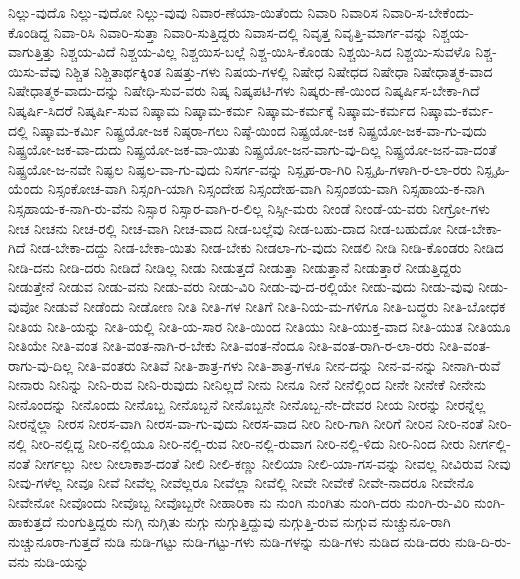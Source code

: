 {ನಿಲ್ಲು-ವುದೊ
ನಿಲ್ಲು-ವುದೋ
ನಿಲ್ಲು-ವುವು
ನಿವಾರ-ಣೆಯಾ-ಯಿತೆಂದು
ನಿವಾರಿ
ನಿವಾರಿಸ
ನಿವಾರಿ-ಸ-ಬೇಕೆಂದು-ಕೊಂಡಿದ್ದ
ನಿವಾ-ರಿಸಿ
ನಿವಾರಿ-ಸುತ್ತಾ
ನಿವಾರಿ-ಸುತ್ತಿದ್ದರು
ನಿವಾಸ-ದಲ್ಲಿ
ನಿವೃತ್ತ
ನಿವೃತ್ತಿ-ಮಾರ್ಗ-ವನ್ನು
ನಿಶ್ಚಯ-ವಾಗುತ್ತಿತ್ತು
ನಿಶ್ಚಯ-ವಿದೆ
ನಿಶ್ಚಯ-ವಿಲ್ಲ
ನಿಶ್ಚಯಿಸ-ಬಲ್ಲೆ
ನಿಶ್ಚ-ಯಿಸಿ-ಕೊಂಡು
ನಿಶ್ಚಯಿ-ಸಿದ
ನಿಶ್ಚಯಿ-ಸುವಳೊ
ನಿಶ್ಚ-ಯಿಸು-ವೆವು
ನಿಶ್ಚಿತ
ನಿಶ್ಚಿತಾರ್ಥಕ್ಕಿಂತ
ನಿಷತ್ತು-ಗಳು
ನಿಷಯ-ಗಳಲ್ಲಿ
ನಿಷೇಧ
ನಿಷೇಧದ
ನಿಷೇಧಾ
ನಿಷೇಧಾತ್ಮಕ-ವಾದ
ನಿಷೇಧಾತ್ಮಕ-ವಾದು-ದನ್ನು
ನಿಷೇಧಿ-ಸುವ-ವರು
ನಿಷ್ಕ
ನಿಷ್ಕಪಟಿ-ಗಳು
ನಿಷ್ಕರು-ಣೆ-ಯಿಂದ
ನಿಷ್ಕರ್ಷಿಸ-ಬೇಕಾ-ಗಿದೆ
ನಿಷ್ಕರ್ಷಿ-ಸಿದರೆ
ನಿಷ್ಕರ್ಷಿ-ಸುವ
ನಿಷ್ಕಾಮ
ನಿಷ್ಕಾಮ-ಕರ್ಮ
ನಿಷ್ಕಾಮ-ಕರ್ಮಕ್ಕೆ
ನಿಷ್ಕಾಮ-ಕರ್ಮದ
ನಿಷ್ಕಾಮ-ಕರ್ಮ-ದಲ್ಲಿ
ನಿಷ್ಕಾಮ-ಕರ್ಮಿ
ನಿಷ್ಟ್ರಯೋ-ಜಕ
ನಿಷ್ಠರಾ-ಗಲು
ನಿಷ್ಠೆ-ಯಿಂದ
ನಿಷ್ಪ್ರಯೋ-ಜಕ
ನಿಷ್ಪ್ರಯೋ-ಜಕ-ವಾ-ಗು-ವುದು
ನಿಷ್ಪ್ರಯೋ-ಜಕ-ವಾ-ದುದು
ನಿಷ್ಪ್ರಯೋ-ಜಕ-ವಾ-ಯಿತು
ನಿಷ್ಪ್ರಯೋ-ಜನ-ವಾಗು-ವು-ದಿಲ್ಲ
ನಿಷ್ಪ್ರಯೋ-ಜನ-ವಾ-ದಂತೆ
ನಿಷ್ಪ್ರಯೋ-ಜ-ನವೇ
ನಿಷ್ಫಲ
ನಿಷ್ಫಲ-ವಾ-ಗು-ವುದು
ನಿಸರ್ಗ-ವನ್ನು
ನಿಸ್ಪೃಹ-ರಾ-ಗಿರಿ
ನಿಸ್ಪೃಹಿ-ಗಳಾಗಿ-ರ-ಲಾ-ರರು
ನಿಸ್ಪೃಹಿ-ಯೆಂದು
ನಿಸ್ಸಂಕೋಚ-ವಾಗಿ
ನಿಸ್ಸಂಗಿ-ಯಾಗಿ
ನಿಸ್ಸಂದೇಹ
ನಿಸ್ಸಂದೇಹ-ವಾಗಿ
ನಿಸ್ಸಂಶಯ-ವಾಗಿ
ನಿಸ್ಸಹಾಯ-ಕ-ನಾಗಿ
ನಿಸ್ಸಹಾಯ-ಕ-ನಾಗಿ-ರು-ವೆನು
ನಿಸ್ಸಾರ
ನಿಸ್ಸಾರ-ವಾಗಿ-ರ-ಲಿಲ್ಲ
ನಿಸ್ಸೀ-ಮರು
ನೀಂಡೆ
ನೀಂಡೆ-ಯ-ವರು
ನೀಗ್ರೋ-ಗಳು
ನೀಚ
ನೀಚನು
ನೀಚ-ರಲ್ಲಿ
ನೀಚ-ವಾಗಿ
ನೀಚ-ವಾದ
ನೀಡ-ಬಲ್ಲೆವು
ನೀಡ-ಬಹು-ದಾದ
ನೀಡ-ಬಹುದೋ
ನೀಡ-ಬೇಕಾ-ಗಿದೆ
ನೀಡ-ಬೇಕಾ-ದದ್ದು
ನೀಡ-ಬೇಕಾ-ಯಿತು
ನೀಡ-ಬೇಕು
ನೀಡಲಾ-ಗು-ವುದು
ನೀಡಲಿ
ನೀಡಿ
ನೀಡಿ-ಕೊಂಡರು
ನೀಡಿದ
ನೀಡಿ-ದನು
ನೀಡಿ-ದರು
ನೀಡಿದೆ
ನೀಡಿಲ್ಲ
ನೀಡು
ನೀಡುತ್ತದೆ
ನೀಡುತ್ತಾ
ನೀಡುತ್ತಾನೆ
ನೀಡುತ್ತಾರೆ
ನೀಡುತ್ತಿದ್ದರು
ನೀಡುತ್ತೇನೆ
ನೀಡುವ
ನೀಡು-ವನು
ನೀಡು-ವರು
ನೀಡು-ವಿರಿ
ನೀಡು-ವು-ದ-ರಲ್ಲಿಯೇ
ನೀಡು-ವುದು
ನೀಡು-ವುವು
ನೀಡು-ವುವೋ
ನೀಡುವೆ
ನೀಡೆಂದು
ನೀಡೋಣ
ನೀತಿ
ನೀತಿ-ಗಳ
ನೀತಿಗೆ
ನೀತಿ-ನಿಯ-ಮ-ಗಳಿಗೂ
ನೀತಿ-ಬದ್ಧರು
ನೀತಿ-ಬೋಧಕ
ನೀತಿಯ
ನೀತಿ-ಯನ್ನು
ನೀತಿ-ಯಲ್ಲಿ
ನೀತಿ-ಯ-ಸಾರ
ನೀತಿ-ಯಿಂದ
ನೀತಿಯು
ನೀತಿ-ಯುಕ್ತ-ವಾದ
ನೀತಿ-ಯುತ
ನೀತಿಯೂ
ನೀತಿಯೇ
ನೀತಿ-ವಂತ
ನೀತಿ-ವಂತ-ನಾಗಿ-ರ-ಬೇಕು
ನೀತಿ-ವಂತ-ನೆಂದೂ
ನೀತಿ-ವಂತ-ರಾಗಿ-ರ-ಲಾ-ರರು
ನೀತಿ-ವಂತ-ರಾಗು-ವು-ದಿಲ್ಲ
ನೀತಿ-ವಂತರು
ನೀತಿವೆ
ನೀತಿ-ಶಾತ್ರ-ಗಳು
ನೀತಿ-ಶಾತ್ರ-ಗಳೂ
ನೀನ-ದನ್ನು
ನೀನ-ವ-ನನ್ನು
ನೀನಾಗಿ-ರುವೆ
ನೀನಾರು
ನೀನಿನ್ನು
ನೀನಿ-ರುವ
ನೀನಿ-ರುವುದು
ನೀನಿಲ್ಲದೆ
ನೀನು
ನೀನೂ
ನೀನೆ
ನೀನೆಲ್ಲಿಂದ
ನೀನೇ
ನೀನೇಕೆ
ನೀನೇನು
ನೀನೊಂದನ್ನು
ನೀನೊಂದು
ನೀನೊಬ್ಬ
ನೀನೊಬ್ಬನೆ
ನೀನೊಬ್ಬನೇ
ನೀನೊಬ್ಬ-ನೇ-ದೇವರ
ನೀಯ
ನೀರನ್ನು
ನೀರನ್ನೆಲ್ಲ
ನೀರನ್ನೆಲ್ಲಾ
ನೀರಸ
ನೀರಸ-ವಾಗಿ
ನೀರಸ-ವಾ-ಗು-ವುದು
ನೀರಸ-ವಾದ
ನೀರಿ
ನೀರಿ-ಗಾಗಿ
ನೀರಿಗೆ
ನೀರಿನ
ನೀರಿ-ನಂತೆ
ನೀರಿ-ನಲ್ಲಿ
ನೀರಿ-ನಲ್ಲಿದ್ದ
ನೀರಿ-ನಲ್ಲಿಯೂ
ನೀರಿ-ನಲ್ಲಿ-ರುವ
ನೀರಿ-ನಲ್ಲಿ-ರುವಾಗ
ನೀರಿ-ನಲ್ಲಿ-ಳಿದು
ನೀರಿ-ನಿಂದ
ನೀರು
ನೀರ್ಗಲ್ಲಿ-ನಂತೆ
ನೀರ್ಗಲ್ಲು
ನೀಲ
ನೀಲಾಕಾಶ-ದಂತೆ
ನೀಲಿ
ನೀಲಿ-ಕಣ್ಣು
ನೀಲಿಯಾ
ನೀಲಿ-ಯಾ-ಗಸ-ವನ್ನು
ನೀವಲ್ಲ
ನೀವಿರುವ
ನೀವು
ನೀವು-ಗಳೆಲ್ಲ
ನೀವೂ
ನೀವೆ
ನೀವೆಲ್ಲ
ನೀವೆಲ್ಲರೂ
ನೀವೆಲ್ಲಾ
ನೀವೆಲ್ಲಿ
ನೀವೇ
ನೀವೇಕೆ
ನೀವೇ-ನಾದರೂ
ನೀವೇನೊ
ನೀವೇನೋ
ನೀವೊಂದು
ನೀವೊಬ್ಬ
ನೀವೊಬ್ಬರೇ
ನೀಹಾರಿಕಾ
ನು
ನುಂಗಿ
ನುಂಗಿತು
ನುಂಗಿ-ದರು
ನುಂಗಿ-ರು-ವಿರಿ
ನುಂಗಿ-ಹಾಕುತ್ತದೆ
ನುಂಗುತ್ತಿದ್ದರು
ನುಗ್ಗಿ
ನುಗ್ಗಿತು
ನುಗ್ಗು
ನುಗ್ಗುತ್ತಿದ್ದುವು
ನುಗ್ಗುತ್ತಿ-ರುವ
ನುಗ್ಗುವ
ನುಚ್ಚುನೂ-ರಾಗಿ
ನುಚ್ಚುನೂರಾ-ಗುತ್ತದೆ
ನುಡಿ
ನುಡಿ-ಗಟ್ಟು
ನುಡಿ-ಗಟ್ಟು-ಗಳು
ನುಡಿ-ಗಳನ್ನು
ನುಡಿ-ಗಳು
ನುಡಿದ
ನುಡಿ-ದರು
ನುಡಿ-ದಿ-ರು-ವನು
ನುಡಿ-ಯನ್ನು
}
